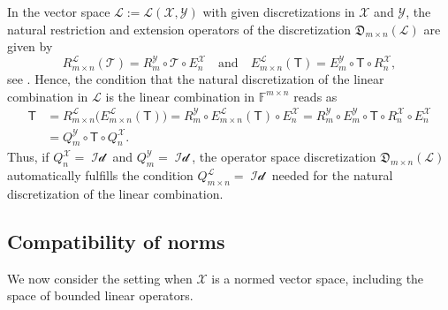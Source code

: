 \documentclass[a4paper]{paper}
\newcommand{\Discr}{\mathfrak{D}}
\newcommand{\Spc}[1]{\mathscr{#1}}
\newcommand{\Field}{\mathbb{F}}
\newcommand{\Op}[1]{\mathcal{#1}}
\newcommand{\DiscOp}[1]{\mathsf{#1}}
\newcommand*{\EXT}[2]{\ensuremath{E_{#1}^{#2}}}
\newcommand*{\REST}[2]{\ensuremath{R_{#1}^{#2}}}
\newcommand*{\COPROJ}[2]{\ensuremath{Q_{#1}^{#2}}}
\newcommand*{\RnX}{\ensuremath{\REST{n}{\Spc{X}}}}
\newcommand*{\RmY}{\ensuremath{\REST{m}{\Spc{Y}}}}
\newcommand*{\EnX}{\ensuremath{\EXT{n}{\Spc{X}}}}
\newcommand*{\EmY}{\ensuremath{\EXT{m}{\Spc{Y}}}}
\newcommand*{\QnX}{\ensuremath{\COPROJ{n}{\Spc{X}}}}
\newcommand*{\QmY}{\ensuremath{\COPROJ{m}{\Spc{Y}}}}
\DeclareMathOperator{\Id}{Id}
\begin{document}
\begin{remark}
 \label{remark:prop:lincomb:natural_linop_space}
 In the vector space $\Spc{L} := \Spc{L}(\Spc{X}, \Spc{Y})$ with given discretizations in $\Spc{X}$ and $\Spc{Y}$, the 
 natural restriction and extension operators of the discretization $\Discr_{m\times n}(\Spc{L})$ are given by
 \begin{equation*}
  \REST{m\times n}{\Spc{L}}(\Op{T}) = \RmY \circ \Op{T} \circ \EnX
  \quad\text{and}\quad
  \EXT{m\times n}{\Spc{L}}(\DiscOp{T}) = \EmY \circ \DiscOp{T} \circ \RnX,
 \end{equation*}
 see . Hence, the condition that the natural discretization of 
 the linear combination in $\Spc{L}$ is the linear combination in $\Field^{m\times n}$ reads as
 \begin{align*}
  \DiscOp{T} 
  &= \REST{m\times n}{\Spc{L}}\big( \EXT{m\times n}{\Spc{L}}(\DiscOp{T}) \big)
  = \RmY \circ \EXT{m\times n}{\Spc{L}}(\DiscOp{T}) \circ \EnX
  = \RmY \circ \EmY \circ \DiscOp{T} \circ \RnX \circ \EnX \\
  &= \QmY \circ \DiscOp{T} \circ \QnX.
 \end{align*}
 Thus, if $\QnX = \Op{\Id}$ and $\QmY = \Op{\Id}$, the operator space discretization $\Discr_{m\times n}(\Spc{L})$ 
 automatically fulfills the condition $\COPROJ{m\times n}{\Spc{L}} = \Op{\Id}$ needed for the natural discretization of 
 the linear combination.
\end{remark}



\subsection{Compatibility of norms}
\label{subsec:prop:norm}

We now consider the setting when $\Spc{X}$ is a normed vector space, including the space of bounded linear operators.
\end{document}
